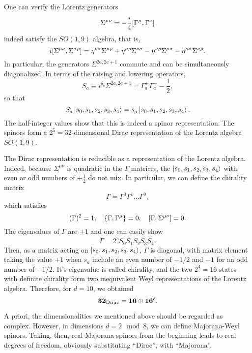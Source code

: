 \begin{mdframed}
One can verify the Lorentz generators
\begin{equation}
    \Sigma^{\mu\nu} = -\frac{i}{4} \comm{\Gamma^\mu}{\Gamma^\nu}
\end{equation}
indeed satisfy the $SO(1,9)$ algebra, that is,
\begin{equation}
    i \comm{\Sigma^{\mu\nu}}{\Sigma^{\sigma\rho}} = \eta^{\nu\sigma} \Sigma^{\mu\rho} + \eta^{\mu\rho}\Sigma^{\nu\sigma} - \eta^{\nu\rho}\Sigma^{\mu\sigma} - \eta^{\mu\sigma}\Sigma^{\nu\rho}.
\end{equation}
In particular, the generators $\Sigma^{2a,2a+1}$ commute and can be simultaneously diagonalized. In terms of the raising and lowering operators,
\begin{equation}
    S_a \equiv i^{\delta_a} \Sigma^{2a,2a+1} = \Gamma^+_a \Gamma^-_a - \frac{1}{2},
\end{equation}
so that
\begin{equation}
    S_a \ket{s_0,s_1,s_2,s_3,s_4} = s_a \ket{s_0,s_1,s_2,s_3,s_4}.
\end{equation}
The half-integer values show that this is indeed a spinor representation. The spinors form a $2^5 = 32$-dimensional Dirac representation of the Lorentz algebra $SO(1,9)$.

The Dirac representation is reducible as a representation of the Lorentz algebra. Indeed, because $\Sigma^{\mu\nu}$ is quadratic in the $\Gamma$ matrices, the $\ket{s_0,s_1,s_2,s_3,s_4}$ with even or odd numbers of $+\frac{1}{2}$ do not mix. In particular, we can define the chirality matrix 
\begin{equation}
    \Gamma = \Gamma^0 \Gamma^1 \dots \Gamma^9,
\end{equation}
which satisfies
\begin{equation}
    (\Gamma)^2 = 1, \quad \{ \Gamma,\Gamma^\mu \} =0, \quad \comm{\Gamma}{\Sigma^{\mu\nu}} = 0.
\end{equation}
The eigenvalues of $\Gamma$ are $\pm 1$ and one can easily show
\begin{equation}
    \Gamma = 2^5 S_0 S_1 S_2 S_3 S_4 .
\end{equation}
Then, as a matrix acting on $\ket{s_0,s_1,s_2,s_3,s_4}$, $\Gamma$ is diagonal, with matrix element taking the value $+1$ when $s_a$ include an even number of $-1/2$ and $-1$ for an odd number of $-1/2$. It's eigenvalue is called chirality, and the two $2^4 = 16$ states with definite chirality form two inequivalent Weyl representations of the Lorentz algebra. Therefore, for $d=10$, we obtained
\begin{equation}\label{eq:clifford-branch}
    \boldsymbol{32}_\textup{Dirac} = \boldsymbol{16} \oplus \boldsymbol{16'} .
\end{equation}

A priori, the dimensionalities we mentioned above should be regarded as complex. However, in dimensions $d = 2 \mod 8$, we can define Majorana-Weyl spinors. Taking, then, real Majorana spinors from the beginning leads to real degrees of freedom, obviously substituting “Dirac”, with “Majorana”.
\end{mdframed}

